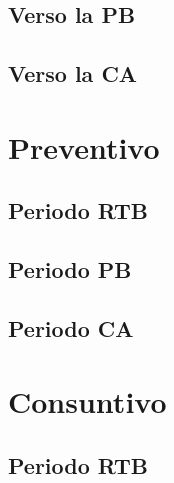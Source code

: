\documentclass[5pt]{article}
\begin{document}
\subsection{Verso la PB}
\subsection{Verso la CA}

\section{Preventivo}
\subsection{Periodo RTB}
\subsection{Periodo PB}
\subsection{Periodo CA}

\section{Consuntivo}
\subsection{Periodo RTB}
\end{document}
